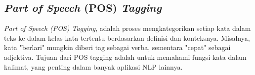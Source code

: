 \subsection{\textit{Part of Speech} (POS) \textit{Tagging}}

\textit{Part of Speech (POS) Tagging}, adalah proses mengkategorikan setiap kata dalam teks ke dalam kelas kata tertentu berdasarkan definisi dan konteksnya. Misalnya, kata "berlari" mungkin diberi tag sebagai verba, sementara "cepat" sebagai adjektiva. Tujuan dari POS tagging adalah untuk memahami fungsi kata dalam kalimat, yang penting dalam banyak aplikasi NLP lainnya.
